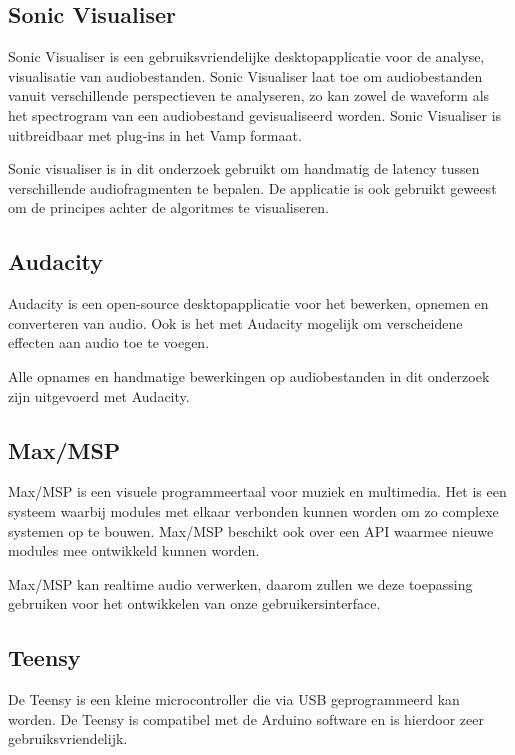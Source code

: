 \subsection{Sonic Visualiser}

Sonic Visualiser is een gebruiksvriendelijke desktopapplicatie voor de analyse, visualisatie van audiobestanden. Sonic Visualiser laat toe om audiobestanden vanuit verschillende perspectieven te analyseren, zo kan zowel de waveform als het spectrogram van een audiobestand gevisualiseerd worden. Sonic Visualiser is uitbreidbaar met plug-ins in het Vamp formaat. \cite{cannam2010sonic}

Sonic visualiser is in dit onderzoek gebruikt om handmatig de latency tussen verschillende audiofragmenten te bepalen. De applicatie is ook gebruikt geweest om de principes achter de algoritmes te visualiseren. 

\subsection{Audacity}

Audacity is een open-source desktopapplicatie voor het bewerken, opnemen en converteren van audio. Ook is het met Audacity mogelijk om verscheidene effecten aan audio toe te voegen.\cite{audacity2016}

Alle opnames en handmatige bewerkingen op audiobestanden in dit onderzoek zijn uitgevoerd met Audacity.


\subsection{Max/MSP}

Max/MSP is een visuele programmeertaal voor muziek en multimedia. Het is een systeem waarbij modules met elkaar verbonden kunnen worden om zo complexe systemen op te bouwen. Max/MSP beschikt ook over een API waarmee nieuwe modules mee ontwikkeld kunnen worden. \cite{cycling2016}

Max/MSP kan realtime audio verwerken, daarom zullen we deze toepassing gebruiken voor het ontwikkelen van onze gebruikersinterface. 

\subsection{Teensy}

De Teensy is een kleine microcontroller die via USB geprogrammeerd kan worden. De Teensy is compatibel met de Arduino software en is hierdoor zeer gebruiksvriendelijk. \cite{teensy2016}

